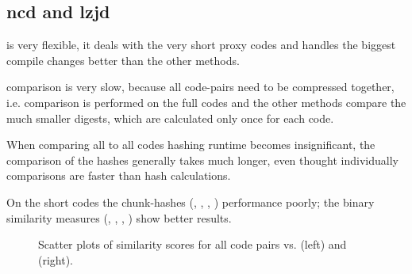 \documentclass[../main.tex]{subfiles}
\begin{document}
\subsection{ncd and lzjd}
\begin{hyp}
   is very flexible, it deals with the very short proxy codes and handles the biggest compile changes better than the other methods.
\end{hyp}
\begin{obs}
   comparison is very slow, because all code-pairs need to be compressed together, i.e.  comparison is performed on the full codes and the other methods compare the much smaller digests, which are calculated only once for each code.
\end{obs}
\begin{obs}
  When comparing all to all codes hashing runtime becomes insignificant, the comparison of the hashes generally takes much longer, even thought individually comparisons are faster than hash calculations.
\end{obs}
\begin{hyp}
  On the short  codes the chunk-hashes (, , , ) performance poorly; the binary similarity measures (, , , ) show better results.
\end{hyp}

\begin{figure}[ht!]
  \centering
  \caption{Scatter plots of  similarity scores for all \n{\solcts} code pairs vs.  (left) and  (right).}
  \label{fig:ncdLzScat}
\end{figure}
\end{document}
